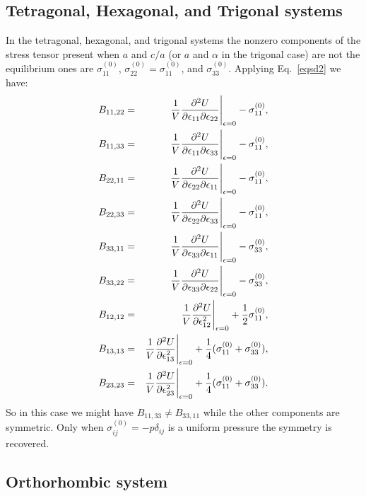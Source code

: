 \documentclass[12pt,a4paper,twoside]{report}
\begin{document}
{\color{web-blue}\subsection{Tetragonal, Hexagonal, and Trigonal systems}}
\color{black}

In the tetragonal, hexagonal, and trigonal systems the nonzero components 
of the stress tensor present when $a$ and $c/a$ (or $a$ and $\alpha$ in
the trigonal case) are not the equilibrium ones are
$\sigma^{(0)}_{11}$, $\sigma^{(0)}_{22}=\sigma^{(0)}_{11}$, and
$\sigma^{(0)}_{33}$.
Applying Eq.~\ref{eqsd2} we have:
\begin{eqnarray}
B_{11,22} &=& {1 \over V}{\partial^2 U \over \partial \epsilon_{11} 
\partial \epsilon_{22}}\Bigg|_{\epsilon=0} - \sigma^{(0)}_{11}, \\
B_{11,33} &=& {1 \over V}{\partial^2 U \over \partial \epsilon_{11} 
\partial \epsilon_{33}}\Bigg|_{\epsilon=0} - \sigma^{(0)}_{11}, \\
B_{22,11} &=& {1 \over V}{\partial^2 U \over \partial \epsilon_{22} 
\partial \epsilon_{11}}\Bigg|_{\epsilon=0} - \sigma^{(0)}_{11}, \\
B_{22,33} &=& {1 \over V}{\partial^2 U \over \partial \epsilon_{22} 
\partial \epsilon_{33}}\Bigg|_{\epsilon=0} - \sigma^{(0)}_{11}, \\
B_{33,11} &=& {1 \over V}{\partial^2 U \over \partial \epsilon_{33} 
\partial \epsilon_{11}}\Bigg|_{\epsilon=0} - \sigma^{(0)}_{33}, \\
B_{33,22} &=& {1 \over V}{\partial^2 U \over \partial \epsilon_{33} 
\partial \epsilon_{22}}\Bigg|_{\epsilon=0} - \sigma^{(0)}_{33}, \\
B_{12,12} &=& {1 \over V}{\partial^2 U \over \partial \epsilon_{12}^2 }\Bigg|_{\epsilon=0} + {1\over 2} \sigma^{(0)}_{11}, \\
B_{13,13} &=& {1 \over V}{\partial^2 U \over \partial \epsilon_{13}^2}\Bigg|_{\epsilon=0} + {1\over 4} (\sigma^{(0)}_{11}+\sigma^{(0)}_{33}), \\
B_{23,23} &=& {1 \over V}{\partial^2 U \over \partial \epsilon_{23}^2 }\Bigg|_{\epsilon=0} + {1\over 4} (\sigma^{(0)}_{11}+\sigma^{(0)}_{33}).
\end{eqnarray}
So in this case we might have $B_{11,33} \ne B_{33,11}$ while the other
components are symmetric. Only when $\sigma^{(0)}_{ij}=-p\delta_{ij}$
is a uniform pressure the symmetry is recovered.

{\color{web-blue}\subsection{Orthorhombic system}}
\color{black}
\end{document}
